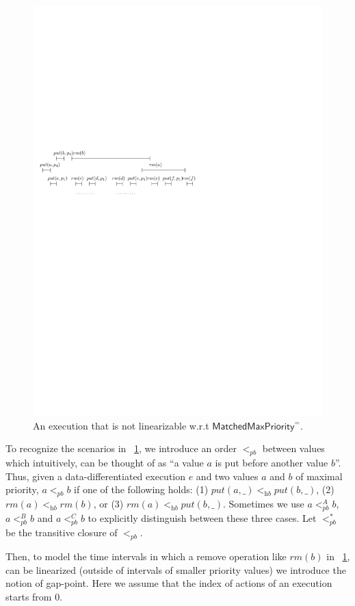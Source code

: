 \begin{figure}[htbp]
  \centering
  \includegraphics[width=0.6 \textwidth]{figures/PIC-HIS-INTRO-PB-ORDER-EPQ.pdf}
  \caption{An execution that is not linearizable w.r.t $\mathsf{MatchedMaxPriority}^=$.}
  \label{fig:introduce pb order}
\end{figure}

To recognize the scenarios in \figurename~\ref{fig:introduce pb order}, we introduce an order $<_{\textit{pb}}$ between values which intuitively, can be thought of as ``a value $a$ is put before another value $b$''. %
Thus, given a data-differentiated execution $e$ and two values $a$ and $b$ of maximal priority, $a <_{\textit{pb}} b$ if one of the following holds: (1) $\textit{put}(a,\_) <_{\textit{hb}} \textit{put}(b,\_)$, (2) $\textit{rm}(a) <_{\textit{hb}} \textit{rm}(b)$, or (3) $\textit{rm}(a) <_{\textit{hb}} \textit{put}(b,\_)$. Sometimes we use $a <_{\textit{pb}}^A b$, $a <_{\textit{pb}}^B b$ and $a <_{\textit{pb}}^C b$ to explicitly distinguish between these three cases. Let $<_{\textit{pb}}^*$ be the transitive closure of $<_{\textit{pb}}$.

Then, to model the time intervals in which a remove operation like $\textit{rm}(b)$ in \figurename~\ref{fig:introduce pb order}, can be linearized (outside of intervals of smaller priority values) we introduce the notion of gap-point. Here we assume that the index of actions of an execution starts from $0$.

